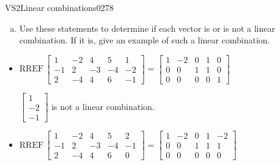 \begin{exercise}{VS2}{Linear combinations}{0278}
\begin{exerciseStatement}
\begin{enumerate}[(a)]
\begin{itemize}
 
\end{itemize}

     
\item  

 Use these statements to determine if each vector is or is not a linear combination. If it is, give an example of such a linear combination. 

 
\end{enumerate}

     \end{exerciseStatement}
 \begin{exerciseAnswer} 

\begin{itemize}
\item  

 \(
\mathrm{RREF}\, \left[\begin{array}{cccc|c}
1 & -2 & 4 & 5 & 1 \\
-1 & 2 & -3 & -4 & -2 \\
2 & -4 & 4 & 6 & -1
\end{array}\right] = \left[\begin{array}{cccc|c}
1 & -2 & 0 & 1 & 0 \\
0 & 0 & 1 & 1 & 0 \\
0 & 0 & 0 & 0 & 1
\end{array}\right]
                        \) 

 

 \(\left[\begin{array}{c}
1 \\
-2 \\
-1
\end{array}\right]\) is not a linear combination. 

 
\item  

 \(
\mathrm{RREF}\, \left[\begin{array}{cccc|c}
1 & -2 & 4 & 5 & 2 \\
-1 & 2 & -3 & -4 & -1 \\
2 & -4 & 4 & 6 & 0
\end{array}\right] = \left[\begin{array}{cccc|c}
1 & -2 & 0 & 1 & -2 \\
0 & 0 & 1 & 1 & 1 \\
0 & 0 & 0 & 0 & 0
\end{array}\right]
                        \) 

 


\end{itemize}
\end{exerciseAnswer}
\end{exercise}
